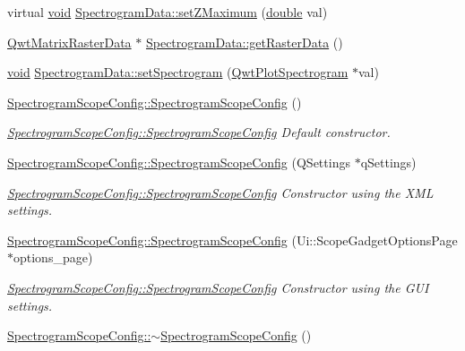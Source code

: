 \begin{DoxyCompactItemize}
\item 
virtual \hyperlink{group___u_a_v_objects_plugin_ga444cf2ff3f0ecbe028adce838d373f5c}{void} \hyperlink{group___scope_plugin_ga90a7b5815000fba373fc23d13506ce5f}{Spectrogram\-Data\-::set\-Z\-Maximum} (\hyperlink{_super_l_u_support_8h_a8956b2b9f49bf918deed98379d159ca7}{double} val)
\item 
\hyperlink{class_qwt_matrix_raster_data}{Qwt\-Matrix\-Raster\-Data} $\ast$ \hyperlink{group___scope_plugin_ga6373cb623e2b93290e6251c913a3330f}{Spectrogram\-Data\-::get\-Raster\-Data} ()
\item 
\hyperlink{group___u_a_v_objects_plugin_ga444cf2ff3f0ecbe028adce838d373f5c}{void} \hyperlink{group___scope_plugin_ga357b6fb785d9356c39fe80f5f1a7d88f}{Spectrogram\-Data\-::set\-Spectrogram} (\hyperlink{class_qwt_plot_spectrogram}{Qwt\-Plot\-Spectrogram} $\ast$val)
\item 
\hyperlink{group___scope_plugin_ga28b2d6eb7e9d8b459d67cef767b92fc5}{Spectrogram\-Scope\-Config\-::\-Spectrogram\-Scope\-Config} ()
\begin{DoxyCompactList}\small\item\em \hyperlink{group___scope_plugin_ga28b2d6eb7e9d8b459d67cef767b92fc5}{Spectrogram\-Scope\-Config\-::\-Spectrogram\-Scope\-Config} Default constructor. \end{DoxyCompactList}\item 
\hyperlink{group___scope_plugin_ga8acde1e8cd1057e318cdccaa2d2935b4}{Spectrogram\-Scope\-Config\-::\-Spectrogram\-Scope\-Config} (Q\-Settings $\ast$q\-Settings)
\begin{DoxyCompactList}\small\item\em \hyperlink{group___scope_plugin_ga28b2d6eb7e9d8b459d67cef767b92fc5}{Spectrogram\-Scope\-Config\-::\-Spectrogram\-Scope\-Config} Constructor using the X\-M\-L settings. \end{DoxyCompactList}\item 
\hyperlink{group___scope_plugin_ga40e298cc36738756669408e5cb4d4166}{Spectrogram\-Scope\-Config\-::\-Spectrogram\-Scope\-Config} (Ui\-::\-Scope\-Gadget\-Options\-Page $\ast$options\-\_\-page)
\begin{DoxyCompactList}\small\item\em \hyperlink{group___scope_plugin_ga28b2d6eb7e9d8b459d67cef767b92fc5}{Spectrogram\-Scope\-Config\-::\-Spectrogram\-Scope\-Config} Constructor using the G\-U\-I settings. \end{DoxyCompactList}\item 
\hyperlink{group___scope_plugin_ga12537968c75d08027a1490766226d871}{Spectrogram\-Scope\-Config\-::$\sim$\-Spectrogram\-Scope\-Config} ()

\end{DoxyCompactItemize}

